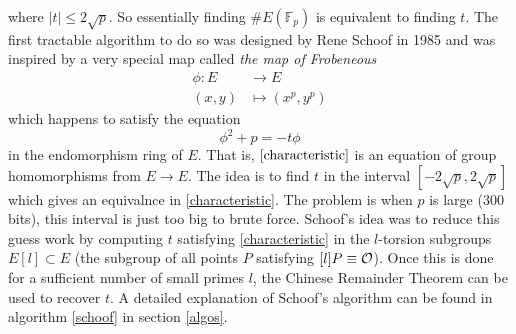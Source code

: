 where $|t| \leq 2  \sqrt{p}$. So essentially finding $\# E(\mathbb{F}_p)$ is equivalent to finding $t$. The first tractable algorithm to do so was designed by Rene Schoof in 1985 and was inspired by a very special map called \textit{the map of Frobeneous}
\begin{align*}
	\phi : E &\rightarrow E \\
	(x,y) &\mapsto (x^p,y^p)
\end{align*}
which happens to satisfy the equation 
\begin{equation} 
	\phi^2 + p = - t \phi \label{characteristic}
\end{equation} 
 in the endomorphism ring of $E$. That is, $\eqref{characteristic}$ is an equation of group homomorphisms from $E \rightarrow E$. The idea is to find $t$ in the interval $[-2 \sqrt{p},2 \sqrt{p}]$ which gives an equivalnce in \eqref{characteristic}. The problem is when $p$ is large ($300$ bits), this interval is just too big to brute force. Schoof's idea was to reduce this guess work by computing $t$ satisfying \eqref{characteristic} in the $l$-torsion subgroups $E[l] \subset E$ (the subgroup of all points $P$ satisfying $[l]P \equiv \mathcal{O}$). Once this is done for a sufficient number of small primes $l$, the Chinese Remainder Theorem can be used to recover $t$. A detailed explanation of Schoof's algorithm can be found in algorithm \ref{schoof} in section \ref{algos}.

